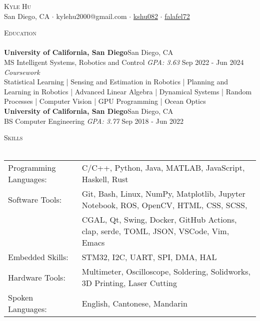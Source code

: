 \documentclass[a4paper]{article}
\newcommand{\lineunder} {
    \vspace*{-8pt} \\
    \hspace*{-18pt} \hrulefill \\
}
\newcommand{\header} [1] {
    {\hspace*{-18pt}\vspace*{6pt} \textsc{#1}}
    \vspace*{-6pt} \lineunder
}
\begin{document}

    

\begin{center}
	{\Huge \scshape {Kyle Hu}}\\
  \vspace{2mm}
	\faGlobe\:San Diego, CA
  $\cdot$ \faEnvelope\:kylehu2000@gmail.com
  $\cdot$ \faLinkedinSquare\:\href{https://www.linkedin.com/in/kshu082/}{kshu082}
  $\cdot$ \faGithubSquare\:\href{https://www.github.com/falafel72}{falafel72} \\
\end{center}

\begin{comment}
\header{Objective}
Looking for an entry-level full time job where I can fully utilize my
robotics education and systems experience.
\end{comment}
\header{Education}
\vspace{1mm}
\textbf{University of California, San Diego}\hfill San Diego, CA\\
MS Intelligent Systems, Robotics and Control \textit{GPA: 3.63} \hfill Sep 2022 - Jun 2024\\
\vspace{1mm}
\textit{Coursework} \\
Statistical Learning | Sensing and Estimation in Robotics | Planning and Learning in Robotics | Advanced Linear Algebra | Dynamical Systems | Random Processes | Computer Vision | GPU Programming | Ocean Optics\\
\vspace{2mm}
\textbf{University of California, San Diego}\hfill San Diego, CA\\
BS Computer Engineering \textit{GPA: 3.77} \hfill Sep 2018 - Jun 2022\\


\vspace{2mm}

\header{Skills}
\vspace{2mm}
\begin{tabular}{ l l }
	Programming Languages: & C/C++, Python, Java, MATLAB, JavaScript, Haskell, Rust  \\
  Software Tools:       & Git, Bash, Linux, NumPy, Matplotlib, Jupyter Notebook, ROS, OpenCV, HTML, CSS, SCSS, \\
   & CGAL, Qt, Swing, Docker, GitHub Actions, clap, serde, TOML, JSON, VSCode, Vim, Emacs \\
  Embedded Skills: & STM32, I2C, UART, SPI, DMA, HAL\\
  Hardware Tools: & Multimeter, Oscilloscope, Soldering, Solidworks, 3D Printing, Laser Cutting \\
	Spoken Languages:      & English, Cantonese, Mandarin                     \\
\end{tabular}
\vspace{2mm}
\end{document}
